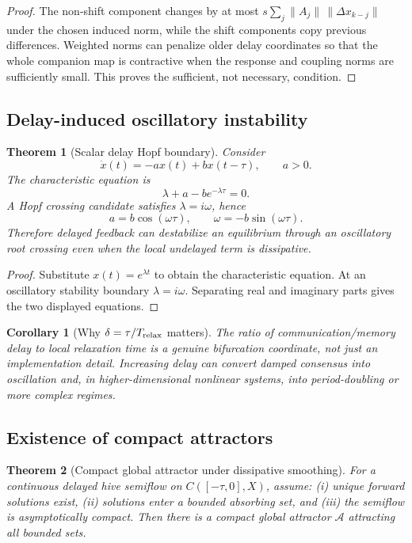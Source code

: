 \documentclass[11pt]{article}
\newtheorem{theorem}{Theorem}
\newtheorem{corollary}{Corollary}
\begin{document}
\begin{proof}
The non-shift component changes by at most
$s\sum_j\|A_j\|\,\|\Delta x_{k-j}\|$ under the chosen induced norm, while the shift
components copy previous differences.  Weighted norms can penalize older delay
coordinates so that the whole companion map is contractive when the response and
coupling norms are sufficiently small.  This proves the sufficient, not necessary,
condition.
\end{proof}

\subsection{Delay-induced oscillatory instability}

\begin{theorem}[Scalar delay Hopf boundary]
Consider
\[
  \dot x(t)=-a x(t)+b x(t-\tau),\qquad a>0.
\]
The characteristic equation is
\[
  \lambda+a-b e^{-\lambda\tau}=0.
\]
A Hopf crossing candidate satisfies $\lambda=i\omega$, hence
\[
  a=b\cos(\omega\tau),\qquad
  \omega=-b\sin(\omega\tau).
\]
Therefore delayed feedback can destabilize an equilibrium through an oscillatory
root crossing even when the local undelayed term is dissipative.
\end{theorem}

\begin{proof}
Substitute $x(t)=e^{\lambda t}$ to obtain the characteristic equation.  At an
oscillatory stability boundary $\lambda=i\omega$.  Separating real and imaginary
parts gives the two displayed equations.
\end{proof}

\begin{corollary}[Why $\delta=\tau/T_{\rm relax}$ matters]
The ratio of communication/memory delay to local relaxation time is a genuine
bifurcation coordinate, not just an implementation detail.  Increasing delay can
convert damped consensus into oscillation and, in higher-dimensional nonlinear
systems, into period-doubling or more complex regimes.
\end{corollary}

\subsection{Existence of compact attractors}

\begin{theorem}[Compact global attractor under dissipative smoothing]
For a continuous delayed hive semiflow on $C([ -\tau,0],X)$, assume: (i) unique
forward solutions exist, (ii) solutions enter a bounded absorbing set, and (iii)
the semiflow is asymptotically compact.  Then there is a compact global attractor
$\mathcal A$ attracting all bounded sets.
\end{theorem}
\end{document}
